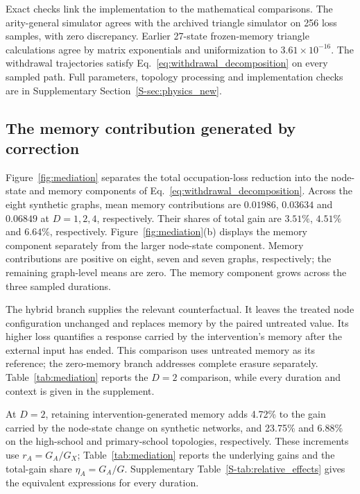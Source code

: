 \documentclass[final,5p,times,twocolumn,sort&compress]{elsarticle}
\theoremstyle{plain}
\begin{document}
Exact checks link the implementation to the mathematical comparisons. The arity-general simulator agrees with the archived triangle simulator on 256 loss samples, with zero discrepancy. Earlier 27-state frozen-memory triangle calculations agree by matrix exponentials and uniformization to $3.61\times10^{-16}$. The withdrawal trajectories satisfy Eq.~\ref{eq:withdrawal_decomposition} on every sampled path. Full parameters, topology processing and implementation checks are in Supplementary Section~\ref{S-sec:physics_new}.

\subsection{The memory contribution generated by correction}
Figure~\ref{fig:mediation} separates the total occupation-loss reduction into the node-state and memory components of Eq.~\ref{eq:withdrawal_decomposition}. Across the eight synthetic graphs, mean memory contributions are $0.01986$, $0.03634$ and $0.06849$ at $D=1,2,4$, respectively. Their shares of total gain are $3.51\%$, $4.51\%$ and $6.64\%$, respectively. Figure~\ref{fig:mediation}(b) displays the memory component separately from the larger node-state component. Memory contributions are positive on eight, seven and seven graphs, respectively; the remaining graph-level means are zero. The memory component grows across the three sampled durations.

The hybrid branch supplies the relevant counterfactual. It leaves the treated node configuration unchanged and replaces memory by the paired untreated value. Its higher loss quantifies a response carried by the intervention's memory after the external input has ended. This comparison uses untreated memory as its reference; the zero-memory branch addresses complete erasure separately. Table~\ref{tab:mediation} reports the $D=2$ comparison, while every duration and context is given in the supplement.

At $D=2$, retaining intervention-generated memory adds 4.72\% to the gain carried by the node-state change on synthetic networks, and 23.75\% and 6.88\% on the high-school and primary-school topologies, respectively. These increments use $r_A=G_A/G_X$; Table~\ref{tab:mediation} reports the underlying gains and the total-gain share $\eta_A=G_A/G$. Supplementary Table~\ref{S-tab:relative_effects} gives the equivalent expressions for every duration.
\end{document}
